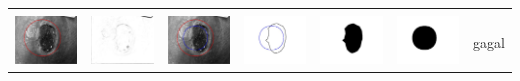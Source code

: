 \begin{table}[H]
\begin{tabular}{|m{0.7in}|m{0.7in}|m{0.7in}|m{0.7in}|m{0.7in}|m{0.7in}|m{0.7in}|}
		&  &  & & & &  \\
		\includegraphics[width=0.7in]{dataset/dataset_3/luka_merah/ready/22_integer_init.jpg}&
		\includegraphics[width=0.7in]{dataset/dataset_3/luka_merah/ready/22_integer_ext.jpg}&
		\includegraphics[width=0.7in]{dataset/dataset_3/luka_merah/ready/22_integer_result.jpg}&
		\includegraphics[width=0.7in]{dataset/dataset_3/luka_merah/ready/22_gt_r_integer.jpg}&
		\includegraphics[width=0.7in]{dataset/dataset_3/luka_merah/ready/22_r.jpg}&
		\includegraphics[width=0.7in]{dataset/dataset_3/luka_merah/ready/22_integer_r.jpg}&
		gagal\\
		\hline
		

\end{tabular}
\end{table}
